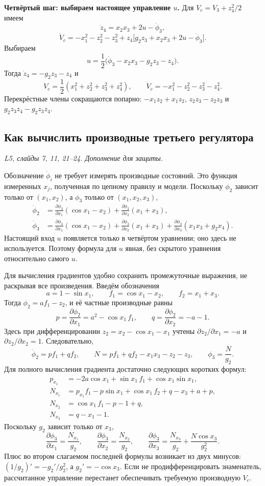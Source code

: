 \textbf{Четвёртый шаг: выбираем настоящее управление $u$.}
Для $V_c=V_3+z_4^2/2$ имеем
\[
  \dot z_4=x_2x_3+2u-\dot\phi_3,
\]
\[
  \dot V_c=-x_1^2-z_2^2-z_3^2+
     z_4\bigl[g_2z_3+x_2x_3+2u-\dot\phi_3\bigr].
\]
Выбираем
\[
  \boxed{u=\frac12
    \bigl(\dot\phi_3-x_2x_3-g_2z_3-z_4\bigr)}.
\]
Тогда $\dot z_4=-g_2z_3-z_4$ и
\[
  V_c=\frac12(x_1^2+z_2^2+z_3^2+z_4^2),\qquad
  \dot V_c=-x_1^2-z_2^2-z_3^2-z_4^2.
\]
Перекрёстные члены сокращаются попарно:
$-x_1z_2+x_1z_2$, $z_2z_3-z_2z_3$ и
$g_2z_3z_4-g_2z_3z_4$.

\subsection{Как вычислить производные третьего регулятора}
\textit{L5, слайды 7, 11, 21--24. Дополнение для защиты.}

Обозначение $\dot\phi_i$ не требует измерять производные состояний.
Это функция измеренных $x_j$, полученная по цепному правилу и модели.
Поскольку $\phi_2$ зависит только от $(x_1,x_2)$,
а $\phi_3$ только от $(x_1,x_2,x_3)$,
\begin{align*}
  \dot\phi_2&=
     \frac{\partial\phi_2}{\partial x_1}(\cos x_1-x_2)
     +\frac{\partial\phi_2}{\partial x_2}(x_1+x_3),\\
  \dot\phi_3&=
     \frac{\partial\phi_3}{\partial x_1}(\cos x_1-x_2)
     +\frac{\partial\phi_3}{\partial x_2}(x_1+x_3)
     +\frac{\partial\phi_3}{\partial x_3}(x_1x_3+g_2x_4).
\end{align*}
Настоящий вход $u$ появляется только в четвёртом уравнении;
оно здесь не используется. Поэтому формула для $u$ явная,
без скрытого уравнения относительно самого $u$.

Для вычисления градиентов удобно сохранить промежуточные выражения,
не раскрывая все произведения. Введём обозначения
\[
  a=1-\sin x_1,\qquad f_1=\cos x_1-x_2,
  \qquad f_2=x_1+x_3.
\]
Тогда $\phi_2=af_1-z_2$, и её частные производные равны
\[
  p=\frac{\partial\phi_2}{\partial x_1}
    =a^2-\cos x_1\,f_1,\qquad
  q=\frac{\partial\phi_2}{\partial x_2}=-a-1.
\]
Здесь при дифференцировании $z_2=x_2-\cos x_1-x_1$ учтены
$\partial z_2/\partial x_1=-a$ и
$\partial z_2/\partial x_2=1$. Следовательно,
\[
  \dot\phi_2=pf_1+qf_2,\qquad
  N=pf_1+qf_2-x_1x_3-z_2-z_3,\qquad \phi_3=\frac{N}{g_2}.
\]
Для полного вычисления градиента достаточно следующих коротких формул:
\begin{align*}
  p_{x_1}&=-2a\cos x_1+\sin x_1\,f_1+\cos x_1\sin x_1,\\
  N_{x_1}&=p_{x_1}f_1-p\sin x_1+\cos x_1\,f_2+q-x_3+a+p,\\
  N_{x_2}&=\cos x_1\,f_1-p-1+q,\\
  N_{x_3}&=q-x_1-1.
\end{align*}
Поскольку $g_2$ зависит только от $x_3$,
\[
  \frac{\partial\phi_3}{\partial x_1}=\frac{N_{x_1}}{g_2},
  \qquad
  \frac{\partial\phi_3}{\partial x_2}=\frac{N_{x_2}}{g_2},
  \qquad
  \frac{\partial\phi_3}{\partial x_3}
     =\frac{N_{x_3}}{g_2}+\frac{N\cos x_3}{g_2^2}.
\]
Плюс во втором слагаемом последней формулы возникает из двух минусов:
$(1/g_2)'=-g_2'/g_2^2$, а $g_2'=-\cos x_3$.
Если не продифференцировать знаменатель, рассчитанное управление
перестанет обеспечивать требуемую производную $V_c$.

